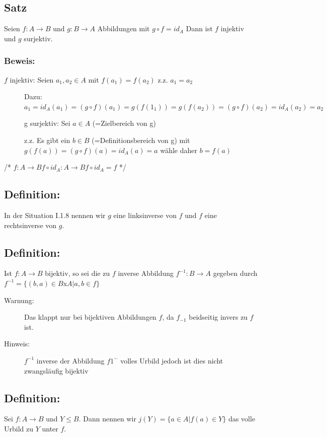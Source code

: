 \subsection{Satz}

Seien $f: A \rightarrow B$ und $g:B \rightarrow A$ Abbildungen mit $g \circ f = id_{A}$ Dann ist $f$ injektiv und $g$ surjektiv.

	\subsubsection{Beweis:}
		$f$ injektiv: Seien $a_{1},a_{2} \in A$ mit $ f(a_{1}) = f(a_{2}) $ z.z. $a_{1} = a_{2}$
		\begin{description}
			\item[]  Dazu: $a_{1} = id_{A}(a_{1}) = (g \circ f) (a_{1}) = g(f(1_{1})) = g(f(a_{2})) = (g \circ f)(a_{2}) = id_{A} (a_{2}) = a_{2}$
			\item[] g surjektiv: Sei $a \in A$ (=Zielbereich von g)
			\item[] z.z. Es gibt ein $b \in B$ (=Definitionsbereich von g) mit $g(f(a)) = (g \circ f)(a) = id_{A}(a) = a$ wähle daher $b=f(a)$
		\end{description}
	/* $f: A \rightarrow B$\qquad $ f\circ id_{A}:A\rightarrow B$\qquad $f\circ id_{A}=f$ */

\subsection{Definition:}
	In der Situation I.1.8 nennen wir $g$ eine linksinverse von $f$ und $f$ eine rechtsinverse von $g$.

\subsection{Definition:}
	Ist $f: A \rightarrow B$ bijektiv, so sei die zu $f$ inverse Abbildung $f^{-1}: B \rightarrow A$ gegeben durch $f^{-1} = \{ (b,a) \in B$x$A| a,b \in f\}$

		\begin{description}
			\item[Warnung:] Das klappt nur bei bijektiven Abbildungen $f$, da $f_{-1}$ beidseitig invers zu $f$ ist. 
			\item[Hinweis:] $f^{-1}$ inverse der Abbildung \qquad $f1^{-}$ volles Urbild jedoch ist dies nicht zwangsläufig bijektiv
		\end{description}

\subsection{Definition:}
	Sei $f:A \rightarrow B$ und $Y \leq B$. Dann nennen wir $j(Y) = \{ a \in A | f(a) \in Y\}$ das volle Urbild zu $Y$ unter $f$. 

